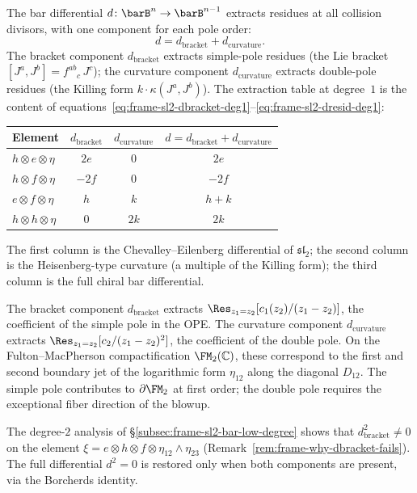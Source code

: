 The bar differential $d\colon \barB^n \to \barB^{n-1}$ extracts
residues at all collision divisors, with one component for each pole
order:
\begin{equation}\label{eq:rosetta-d-decomposition}
d = d_{\mathrm{bracket}} + d_{\mathrm{curvature}}.
\end{equation}
The bracket component $d_{\mathrm{bracket}}$ extracts simple-pole
residues (the Lie bracket $[J^a, J^b] = f^{ab}{}_c\, J^c$); the
curvature component $d_{\mathrm{curvature}}$ extracts double-pole
residues (the Killing form $k \cdot \kappa(J^a, J^b)$). The
extraction table at degree~$1$ is the content of
equations~\eqref{eq:frame-sl2-dbracket-deg1}--\eqref{eq:frame-sl2-dresid-deg1}:
\begin{center}
\small
\renewcommand{\arraystretch}{1.3}
\begin{tabular}{l|c|c|c}
\textbf{Element} & $d_{\mathrm{bracket}}$
 & $d_{\mathrm{curvature}}$ & $d = d_{\mathrm{bracket}} + d_{\mathrm{curvature}}$ \\
\hline
$h \otimes e \otimes \eta$ & $2e$ & $0$ & $2e$ \\
$h \otimes f \otimes \eta$ & $-2f$ & $0$ & $-2f$ \\
$e \otimes f \otimes \eta$ & $h$ & $k$ & $h + k$ \\
$h \otimes h \otimes \eta$ & $0$ & $2k$ & $2k$
\end{tabular}
\end{center}
The first column is the Chevalley--Eilenberg differential of
$\mathfrak{sl}_2$; the second column is the Heisenberg-type curvature
(a multiple of the Killing form); the third column is the full chiral
bar differential.

\begin{remark}
\label{rem:rosetta-two-components}
The bracket component $d_{\mathrm{bracket}}$ extracts
$\Res_{z_1 = z_2}[c_1(z_2)/(z_1 - z_2)]$, the coefficient of
the simple pole in the OPE. The curvature component
$d_{\mathrm{curvature}}$ extracts
$\Res_{z_1 = z_2}[c_2/(z_1 - z_2)^2]$, the coefficient of the
double pole. On the Fulton--MacPherson compactification
$\FM_2(\mathbb{C})$, these correspond to the first and second
boundary jet of the logarithmic form $\eta_{12}$ along the diagonal
$D_{12}$. The simple pole contributes to $\partial\FM_2$ at
first order; the double pole requires the exceptional fiber
direction of the blowup.
\end{remark}

The degree-$2$ analysis of
\S\ref{subsec:frame-sl2-bar-low-degree} shows that
$d_{\mathrm{bracket}}^2 \neq 0$ on the element
$\xi = e \otimes h \otimes f \otimes \eta_{12} \wedge \eta_{23}$
(Remark~\ref{rem:frame-why-dbracket-fails}). The full differential
$d^2 = 0$ is restored only when both components are present, via
the Borcherds identity.



